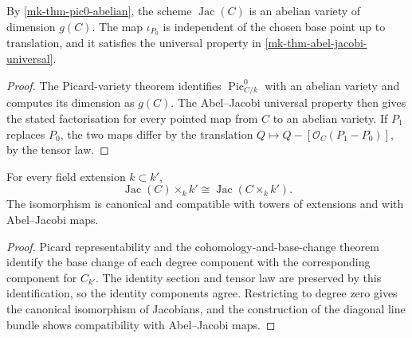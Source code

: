 \begin{theorem}
  \label{mk-thm-jacobian-package}
  \cite{milne-av,kleiman-picard}
  By \ref{mk-thm-pic0-abelian}, the scheme \(\operatorname{Jac}(C)\) is an
  abelian variety of dimension \(g(C)\).  The map \(\iota_{P_0}\) is independent
  of the chosen base point up to translation, and it satisfies the universal
  property in \ref{mk-thm-abel-jacobi-universal}.
\end{theorem}

\begin{proof}
  The Picard-variety theorem identifies \(\operatorname{Pic}^0_{C/k}\) with
  an abelian variety and computes its dimension as \(g(C)\).  The
  Abel--Jacobi universal property then gives the stated factorisation for
  every pointed map from \(C\) to an abelian variety.  If \(P_1\) replaces
  \(P_0\), the two maps differ by the translation
  \(Q\mapsto Q-[\mathcal O_C(P_1-P_0)]\), by the tensor law.
\end{proof}

\begin{theorem}
  \label{mk-thm-jacobian-base-change}
  \cite{kleiman-picard}
  For every field extension \(k\subset k'\),
  \[
    \operatorname{Jac}(C)\times_k k'\cong
    \operatorname{Jac}(C\times_k k').
  \]
  The isomorphism is canonical and compatible with towers of extensions and
  with Abel--Jacobi maps.
\end{theorem}

\begin{proof}
  Picard representability and the cohomology-and-base-change theorem identify
  the base change of each degree component with the corresponding component
  for \(C_{k'}\).  The identity section and tensor law are preserved by this
  identification, so the identity components agree.  Restricting to degree
  zero gives the canonical isomorphism of Jacobians, and the construction of
  the diagonal line bundle shows compatibility with Abel--Jacobi maps.
\end{proof}
